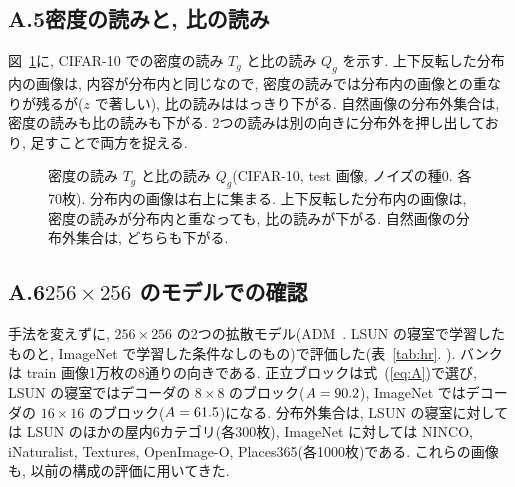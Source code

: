 \documentclass[MIRU,submit]{miru2025j}
\renewcommand{\eqref}[1]{(\ref{#1})}
\begin{document}
\subsection*{A.5\quad 密度の読みと, 比の読み}
\label{sec:supp-scatter}
図~\ref{fig:scatter}に, CIFAR-10 での密度の読み $T_g$ と比の読み $Q_g$ を示す. 上下反転した分布内の画像は, 内容が分布内と同じなので, 密度の読みでは分布内の画像との重なりが残るが($z$ で著しい), 比の読みははっきり下がる. 自然画像の分布外集合は, 密度の読みも比の読みも下がる. 2つの読みは別の向きに分布外を押し出しており, 足すことで両方を捉える.
\begin{figure}[H]\centering

\caption{密度の読み $T_g$ と比の読み $Q_g$(CIFAR-10, test 画像, ノイズの種0. 各70枚). 分布内の画像は右上に集まる. 上下反転した分布内の画像は, 密度の読みが分布内と重なっても, 比の読みが下がる. 自然画像の分布外集合は, どちらも下がる.}
\label{fig:scatter}
\end{figure}

\subsection*{A.6\quad $256{\times}256$ のモデルでの確認}
\label{sec:supp-hr}
手法を変えずに, $256{\times}256$ の2つの拡散モデル(ADM~\cite{dhariwal2021adm}. LSUN の寝室で学習したものと, ImageNet で学習した条件なしのもの)で評価した(表~\ref{tab:hr}. \nHrSeeds). バンクは train 画像1万枚の8通りの向きである. 正立ブロックは式~\eqref{eq:A}で選び, LSUN の寝室ではデコーダの $8{\times}8$ のブロック($A=90.2$), ImageNet ではデコーダの $16{\times}16$ のブロック($A=61.5$)になる. 分布外集合は, LSUN の寝室に対しては LSUN のほかの屋内6カテゴリ(各300枚), ImageNet に対しては NINCO, iNaturalist, Textures, OpenImage-O, Places365(各1000枚)である. これらの画像も, 以前の構成の評価に用いてきた.
\end{document}
